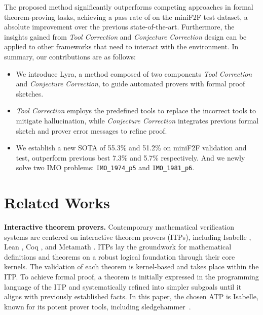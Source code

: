 \documentclass{article} \usepackage{iclr2024_conference,times}
\def\methodOneFull{\textit{Tool Correction}\xspace}
\def\methodTwoFull{\textit{Conjecture Correction}\xspace}
\def\fullname{Lyra\xspace}
\begin{document}
The proposed method significantly outperforms competing approaches in formal theorem-proving tasks, achieving a pass rate of  on the miniF2F test dataset, a  absolute improvement over the previous state-of-the-art. Furthermore, the insights gained from \methodOneFull and \methodTwoFull design can be applied to other frameworks that need to interact with the environment. In summary, our contributions are as follows:
\begin{itemize}[itemsep=5pt,topsep=0pt,parsep=0pt]
  \item We introduce \fullname, a method composed of two components \methodOneFull and \methodTwoFull, to guide automated provers with formal proof sketches.
  \item \methodOneFull employs the predefined
tools to replace the incorrect tools to mitigate hallucination, while \methodTwoFull integrates previous formal sketch and prover error messages to refine proof.
  \item We establish a new SOTA of 55.3\% and 51.2\% on miniF2F validation and test, outperform previous best 7.3\% and 5.7\% respectively. And we newly solve two IMO problems: \texttt{IMO\_1974\_p5} and \texttt{IMO\_1981\_p6}.
\end{itemize}


\section{Related Works}
\textbf{Interactive theorem provers.} 
Contemporary mathematical verification systems are centered on interactive theorem provers (ITPs), including Isabelle \citep{paulson1994isabelle}, Lean \citep{de2015lean}, Coq \citep{barras1997coq}, and Metamath \citep{megill2019computer}. ITPs lay the groundwork for mathematical definitions and theorems on a robust logical foundation through their core kernels. The validation of each theorem is kernel-based and takes place within the ITP. To achieve formal proof, a theorem is initially expressed in the programming language of the ITP and systematically refined into simpler subgoals until it aligns with previously established facts. In this paper, the chosen ATP is Isabelle, known for its potent prover tools, including sledgehammer~\citep{paulson2010three}.
\end{document}
